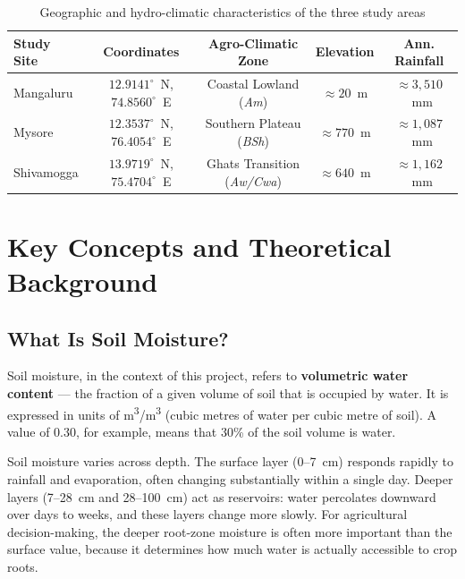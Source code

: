 \documentclass[12pt, a4paper]{article}
\begin{document}
\begin{table}[H]
\centering
\caption{Geographic and hydro-climatic characteristics of the three study areas}
\label{tab:study_sites}
\begin{tabular}{lcccc}
\toprule
\textbf{Study Site} & \textbf{Coordinates} & \textbf{Agro-Climatic Zone} & \textbf{Elevation} & \textbf{Ann. Rainfall} \\
\midrule
Mangaluru  & $12.9141^\circ$~N, $74.8560^\circ$~E & Coastal Lowland (\textit{Am}) & $\approx 20$~m  & $\approx 3,510$~mm \\
Mysore     & $12.3537^\circ$~N, $76.4054^\circ$~E & Southern Plateau (\textit{BSh})& $\approx 770$~m & $\approx 1,087$~mm \\
Shivamogga & $13.9719^\circ$~N, $75.4704^\circ$~E & Ghats Transition (\textit{Aw/Cwa}) & $\approx 640$~m & $\approx 1,162$~mm \\
\bottomrule
\end{tabular}
\end{table}


\section{Key Concepts and Theoretical Background}

\subsection{What Is Soil Moisture?}

Soil moisture, in the context of this project, refers to \textbf{volumetric water content} --- the fraction of a given volume of soil that is occupied by water. It is expressed in units of m\textsuperscript{3}/m\textsuperscript{3} (cubic metres of water per cubic metre of soil). A value of 0.30, for example, means that 30\% of the soil volume is water.

Soil moisture varies across depth. The surface layer (0--7~cm) responds rapidly to rainfall and evaporation, often changing substantially within a single day. Deeper layers (7--28~cm and 28--100~cm) act as reservoirs: water percolates downward over days to weeks, and these layers change more slowly. For agricultural decision-making, the deeper root-zone moisture is often more important than the surface value, because it determines how much water is actually accessible to crop roots.
\end{document}
